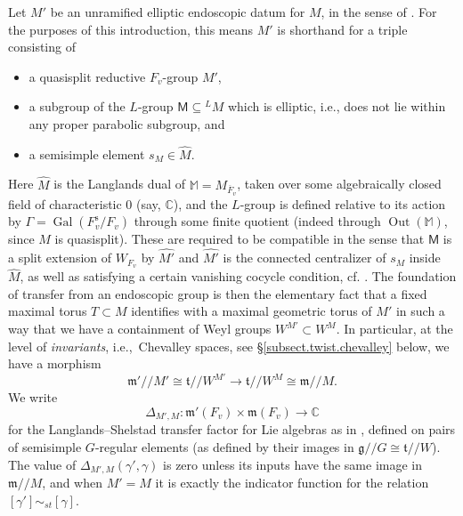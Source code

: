 \documentclass[openany]{amsbook}
\theoremstyle{definition}
\theoremstyle{remark}
\numberwithin{equation}{section}
\newcommand{\C}{\mathbb{C}}
\newcommand{\eM}{\mathsf{M}}
\newcommand{\ol}[1]{\overline{#1}}
\newcommand{\Gal}{\operatorname{Gal}}
\renewcommand{\-}{\operatorname{-}}
\newcommand{\Out}{\operatorname{Out}}
\newcommand{\M}{\mathbb{M}}
\newcommand{\fm}{\mathfrak{m}}
\newcommand{\ft}{\mathfrak{t}}
\renewcommand{\fm}{\mathfrak{m}}
\renewcommand{\fg}{\mathfrak{g}}
\newcommand{\sep}{\text{s}}
\newcommand{\gitq}{/\!/}
\begin{document}
Let $M'$ be an unramified elliptic endoscopic datum for $M$, in the sense of \cite[\S 2]{arthurenddatadef}. For the purposes of this introduction, this means $M'$ is shorthand for a triple consisting of 
\begin{itemize} 
\item a quasisplit reductive $F_v$-group $M'$,
\item a subgroup of the $L$-group $\eM \subseteq {}^L M$ which is elliptic, i.e., does not lie within any proper parabolic subgroup, and
\item a semisimple element $s_M \in \widehat{M}$.
\end{itemize}
Here $\widehat{M}$ is the Langlands dual of $\M = M_{\ol{F}_v}$, taken over some algebraically closed field of characteristic 0 (say, $\C$), and the $L$-group is defined relative to its action by $\Gamma = \Gal(F_v^{\sep}/F_v)$ through some finite quotient (indeed through $\Out(\M)$, since $M$ is quasisplit). These are required to be compatible in the sense that $\eM$ is a split extension of $W_{F_v}$ by $\widehat{M'}$ and $\widehat{M'}$ is the connected centralizer of $s_M$ inside $\widehat{M}$, as well as satisfying a certain vanishing cocycle condition, cf. \cite[\S 1.1.5]{MWStabI}. The foundation of transfer from an endoscopic group is then the elementary fact that a fixed maximal torus $T \subset M$ identifies with a maximal geometric torus of $M'$ in such a way that we have a containment of Weyl groups $W^{M'} \subset W^M$. In particular, at the level of \textit{invariants}, i.e.,\ Chevalley spaces, see \S \ref{subsect.twist.chevalley} below, we have a morphism
$$
    \fm'\gitq M' \cong \ft\gitq W^{M'} \to \ft \gitq W^M \cong \fm \gitq M.
$$
We write $$\Delta_{M',M} : \fm'(F_v) \times \fm(F_v) \to \C$$ for the Langlands--Shelstad transfer factor for Lie algebras as in \cite{waldFLimpliquetransfert}, defined on pairs of semisimple $G$-regular elements (as defined by their images in $\fg\gitq G \cong \ft\gitq W$). The value of $\Delta_{M',M}(\gamma', \gamma)$ is zero unless its inputs have the same image in $\fm\gitq M$, and when $M' = M$ it is exactly the indicator function for the relation $[\gamma'] \sim_{st} [\gamma]$.
\end{document}
